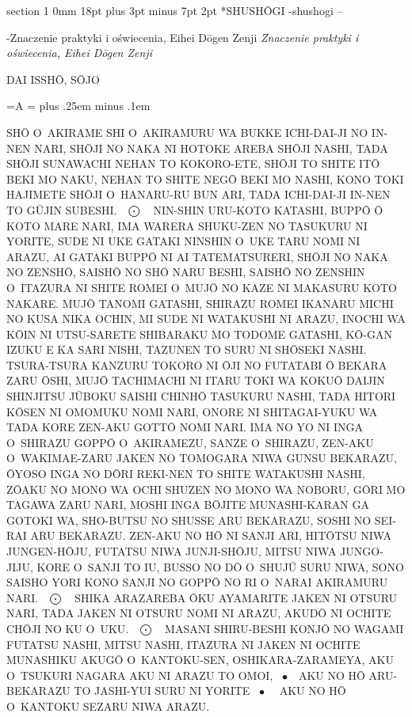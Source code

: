\documentclass[12pt]{article}
\makeatletter
\renewcommand{\section}{\@startsection%
 {section}			%
 {1}				%
 {0mm}				%
 {18pt plus 3pt minus 7pt}	%
 { 2pt}				%
 {\bfseries}}			%
\newcommand{\keisu}		{\mbox{\ $\bigodot$\ \ }}
\newcommand{\shokei}		{\mbox{\ $\bullet$\ \ }}
\newcounter{labelnum}
\newenvironment{Prayer}[4]{%
	\section*{#2}
	\ifx -#1
		\stepcounter{labelnum}\label{label.\arabic{labelnum}}\nopagebreak
	\else
		\label{#1}\nopagebreak
	\fi
	\ifx -#3
		\addcontentsline{toc}{section}{#2}
	\else
		\addcontentsline{toc}{section}{#3}
	\fi
	\ifx -#4
		{}
	\else
		\noindent\emph{#4}\par\nopagebreak
	\fi
	\begingroup
}
{\par\endgroup}
\newcommand{\wersaliki}{%
	\newbox\Abox
	\newdimen\Aspacja
	\setbox\Abox=\hbox{A}
	\Aspacja=\wd\Abox
	\spaceskip \Aspacja plus .25em minus .1em
}
\newenvironment{JAPANESE}
{
	\parindent	0pt
	\parfillskip	0pt
	\language 255
	\begingroup
	\wersaliki
	\par
}
{\par\endgroup}
\makeatother
\begin{document}
\newpage
\begin{Prayer}{shushogi}
	{SHUSH\=OGI}{-}
	{Znaczenie praktyki i oświecenia, Eihei D\=ogen Zenji}


\begin{center}
DAI ISSH\=O, S\=OJO
\end{center}

\begin{JAPANESE}
SH\=O O~AKIRAME SHI O~AKIRAMURU WA BUKKE ICHI-DAI-JI NO IN-NEN NARI,
SH\=OJI NO NAKA NI HOTOKE AREBA SH\=OJI NASHI, TADA SH\=OJI SUNAWACHI NEHAN
TO KOKORO-ETE, SH\=OJI TO SHITE IT\=O BEKI MO NAKU, NEHAN TO SHITE NEG\=O
BEKI MO NASHI, KONO TOKI HAJIMETE SH\=OJI O~HANARU-RU BUN ARI, TADA
ICHI-DAI-JI IN-NEN TO G\=UJIN SUBESHI. \keisu NIN-SHIN URU-KOTO KATASHI,
BUPP\=O \=O KOTO MARE NARI, IMA WARERA SHUKU-ZEN NO TASUKURU NI YORITE,
SUDE NI UKE GATAKI NINSHIN O~UKE TARU NOMI NI ARAZU, AI GATAKI BUPP\=O NI
AI TATEMATSURERI, SH\=OJI NO NAKA NO ZENSH\=O, SAISH\=O NO SH\=O NARU
BESHI, SAISH\=O NO ZENSHIN O~ITAZURA NI SHITE ROMEI O~MUJ\=O NO KAZE NI
MAKASURU KOTO NAKARE. MUJ\=O TANOMI GATASHI, SHIRAZU ROMEI IKANARU MICHI NO
KUSA NIKA OCHIN, MI SUDE NI WATAKUSHI NI ARAZU, INOCHI WA K\=OIN NI
UTSU-SARETE SHIBARAKU MO TODOME GATASHI, K\=O-GAN IZUKU E KA SARI NISHI,
TAZUNEN TO SURU NI SH\=OSEKI NASHI. TSURA-TSURA KANZURU TOKORO NI \=OJI NO
FUTATABI \=O BEKARA ZARU \=OSHI, MUJ\=O TACHIMACHI NI ITARU TOKI WA KOKU\=O
DAIJIN SHINJITSU J\=UBOKU SAISHI CHINH\=O TASUKURU NASHI, TADA HITORI
K\=OSEN NI OMOMUKU NOMI NARI, ONORE NI SHITAGAI-YUKU WA TADA KORE ZEN-AKU
GOTT\=O NOMI NARI. IMA NO YO NI INGA O~SHIRAZU GOPP\=O O~AKIRAMEZU, SANZE
O~SHIRAZU, ZEN-AKU O~WAKIMAE-ZARU JAKEN NO TOMOGARA NIWA GUNSU BEKARAZU,
\=OYOSO INGA NO D\=ORI REKI-NEN TO SHITE WATAKUSHI NASHI, Z\=OAKU NO MONO
WA OCHI SHUZEN NO MONO WA NOBORU, G\=ORI MO TAGAWA ZARU NARI, MOSHI INGA
B\=OJITE MUNASHI-KARAN GA GOTOKI WA, SHO-BUTSU NO SHUSSE ARU BEKARAZU,
SOSHI NO SEI-RAI ARU BEKARAZU. ZEN-AKU NO H\=O NI SANJI ARI, HIT\=OTSU NIWA
JUNGEN-H\=OJU, FUTATSU NIWA JUNJI-SH\=OJU, MITSU NIWA JUNGO-JIJU, KORE
O~SANJI TO IU, BUSSO NO D\=O O~SHUJ\=U SURU NIWA, SONO SAISHO YORI KONO
SANJI NO GOPP\=O NO RI O~NARAI AKIRAMURU NARI. \keisu SHIKA ARAZAREBA \=OKU
AYAMARITE JAKEN NI OTSURU NARI, TADA JAKEN NI OTSURU NOMI NI ARAZU, AKUD\=O
NI OCHITE CH\=OJI NO KU O~UKU. \keisu MASANI SHIRU-BESHI KONJ\=O NO WAGAMI
FUTATSU NASHI, MITSU NASHI, ITAZURA NI JAKEN NI OCHITE MUNASHIKU AKUG\=O
O~KANTOKU-SEN, OSHIKARA-ZARAMEYA, AKU O~TSUKURI NAGARA AKU NI ARAZU TO
OMOI, \shokei AKU NO H\=O ARU-BEKARAZU TO JASHI-YUI SURU NI YORITE \shokei
AKU NO H\=O O~KANTOKU SEZARU NIWA ARAZU.
\end{JAPANESE}



\end{Prayer}
\end{document}
